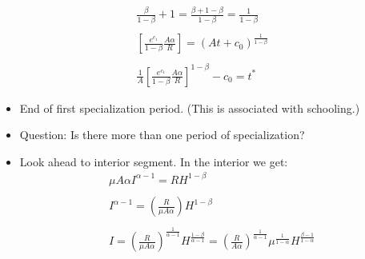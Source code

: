 \documentclass[12pt,compress,handout]{beamer}  %
\begin{document}
\begin{frame}
\begin{gather*}
\frac \beta {1-\beta }+1 = \frac{\beta +1-\beta }{1-\beta }=\frac
1{1-\beta
} \\
\\
\left[ \frac{e^{c_1}}{1-\beta }\frac{A\alpha }R\right] =
(At+c_0)^{\frac
1{1-\beta }} \\
\\
\frac 1A\left[ \frac{e^{c_1}}{1-\beta }\frac{A\alpha }R\right]
^{1-\beta }-c_0 = t^{*}
\end{gather*}

\begin{itemize}[<+->]
\item
End of first specialization period. (This is associated with
schooling.)
\end{itemize}
\end{frame}


\begin{frame}
\begin{itemize}[<+->]
\item
Question: Is there more than one period of specialization?

\item
Look ahead to interior segment. In the interior we get:
\begin{gather*}
\mu A\alpha I^{\alpha -1} = RH^{1-\beta } \\
\\
I^{\alpha -1} = \left( \frac{R}{\mu A\alpha }\right) H^{1-\beta } \\
\\
I = \left( \frac{R}{\mu A\alpha }\right) ^{\frac{1}{\alpha
-1}}H^{\frac{1-\beta }{\alpha -1}} = \left( \frac{R}{A\alpha
}\right) ^{\frac{1}{\alpha -1}}\mu ^{\frac{1}{1-\alpha
}}H^{\frac{\beta -1}{1-\alpha }}
\end{gather*}
\end{itemize}
\end{frame}
\end{document}
